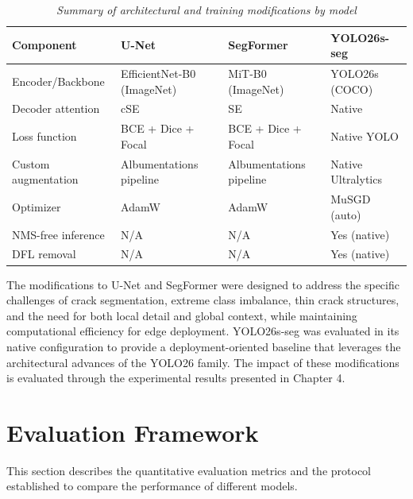 \begin{table}[htbp]
    \centering
    \caption{\textit{Summary of architectural and training modifications by model}}
    \label{tab:modification-summary}
    \begin{tabularx}{\textwidth}{@{}lXXX@{}}
        \hline
        \textbf{Component}  & \textbf{U-Net}             & \textbf{SegFormer}      & \textbf{YOLO26s-seg} \\
        \hline
        Encoder/Backbone    & EfficientNet-B0 (ImageNet) & MiT-B0 (ImageNet)       & YOLO26s (COCO)       \\
        Decoder attention   & cSE                        & SE                      & Native               \\
        Loss function       & BCE + Dice + Focal         & BCE + Dice + Focal      & Native YOLO          \\
        Custom augmentation & Albumentations pipeline    & Albumentations pipeline & Native Ultralytics   \\
        Optimizer           & AdamW                      & AdamW                   & MuSGD (auto)         \\
        NMS-free inference  & N/A                       & N/A                    & Yes (native)         \\
        DFL removal         & N/A                       & N/A                    & Yes (native)         \\
        \hline
    \end{tabularx}
\end{table}

\newpage

\hs The modifications to U-Net and SegFormer were designed to address the specific challenges of crack segmentation, extreme class imbalance, thin crack structures, and the need for both local detail and global context, while maintaining computational efficiency for edge deployment. YOLO26s-seg was evaluated in its native configuration to provide a deployment-oriented baseline that leverages the architectural advances of the YOLO26 family. The impact of these modifications is evaluated through the experimental results presented in Chapter 4.

\section{Evaluation Framework}
\label{sec:evaluation_framework}
\hs This section describes the quantitative evaluation metrics and the protocol established to compare the performance of different models.

